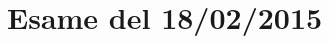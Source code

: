 \documentclass[\main/main.tex]{subfiles}
\begin{document}
\section{Esame del 18/02/2015}

\clearpage

\end{document}
